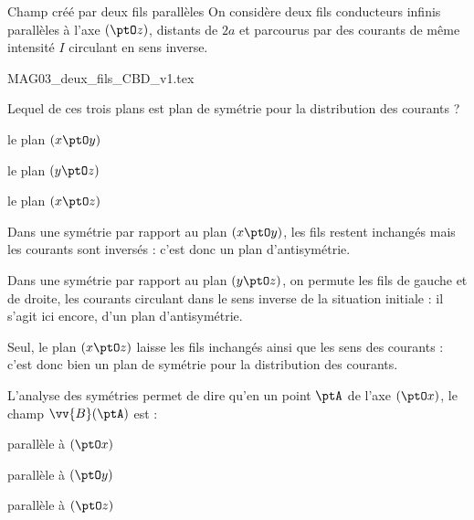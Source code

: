 \begin{exo}[PC][1][appli]{Champ créé par deux fils parallèles}
	\initialisationPartieGauche  
	On considère deux fils conducteurs infinis parallèles à l'axe $(\ptO z)$,
	distants de $2a$ et parcourus par des courants de même intensité $I$ circulant en sens inverse.
	\initialisationPartieDroite 
\vspace{-1cm}
\begin{center}
{MAG03_deux_fils_CBD_v1.tex}
\end{center}
\finalisationDuPartageDePage	

\begin{quest}
	\item	
		Lequel de ces trois plans est plan de symétrie pour la distribution des courants ?
		\begin{listeQCM3Colonnes}
			\item le plan $(x \ptO y)$
			\item le plan $(y \ptO z)$
			\item le plan $(x \ptO z)$
		\end{listeQCM3Colonnes}
		\bigskip

	\begin{corrige}
		Dans une symétrie par rapport au plan $(x \ptO y)$, les fils restent inchangés mais les courants sont inversés  : c'est donc un plan d'antisymétrie.

		Dans une symétrie par rapport au plan $(y \ptO z)$, on permute les fils de gauche et de droite, les courants circulant dans le sens inverse de la situation initiale : il s'agit ici encore, d'un plan d'antisymétrie.

		Seul, le plan $(x \ptO z)$ laisse les fils inchangés ainsi que les sens des courants : c'est donc bien un plan de symétrie pour la distribution des courants. 
	\end{corrige}

		\item 
		L'analyse des symétries permet de dire qu'en un point $\ptA$ de l'axe $(\ptO x)$, le champ $\vv{B}(\ptA)$ est : 
		\begin{listeQCM3Colonnes}
			\item parallèle à $(\ptO x)$
			\item parallèle à $(\ptO y)$
			\item parallèle à $(\ptO z)$
		\end{listeQCM3Colonnes}
		\bigskip


\end{quest}
\end{exo}
